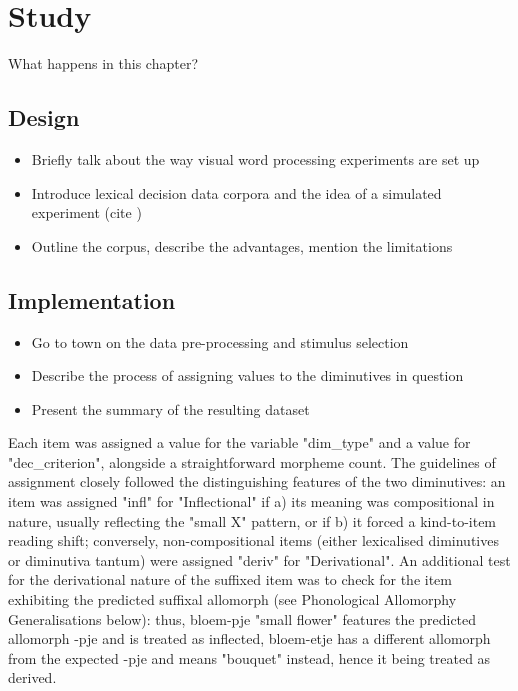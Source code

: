 \chapter{Study}\label{chp:study}

What happens in this chapter?

\section{Design}
\begin{itemize}
\item Briefly talk about the way visual word processing experiments are set up
\item Introduce lexical decision data corpora and the idea of a simulated experiment (cite \cite{Brysbaert+etal+2016})
\item Outline the corpus, describe the advantages, mention the limitations
\end{itemize}
\section{Implementation}
\begin{itemize}
\item Go to town on the data pre-processing and stimulus selection
\item Describe the process of assigning values to the diminutives in question
\item Present the summary of the resulting dataset
\end{itemize}
Each item was assigned a value for the variable "dim\_type" and a value for "dec\_criterion", alongside a straightforward morpheme count. The guidelines of assignment closely followed the distinguishing features of the two diminutives: an item was assigned "infl" for "Inflectional" if a) its meaning was compositional in nature, usually reflecting the "small X" pattern, or if b) it forced a kind-to-item reading shift; conversely, non-compositional items (either lexicalised diminutives or diminutiva tantum) were assigned "deriv" for "Derivational". An additional test for the derivational nature of the suffixed item was to check for the item exhibiting the predicted suffixal allomorph (see Phonological Allomorphy Generalisations below): thus, bloem-pje "small flower" features the predicted allomorph -pje and is treated as inflected, bloem-etje has a different allomorph from the expected -pje and means "bouquet" instead, hence it being treated as derived.  

